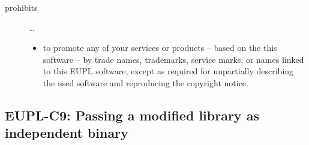 \begin{description}
\begin{itemize}
\end{itemize}

\item[prohibits] \ldots
\begin{itemize}
  \item to promote any of your services or products -- based on the this software
  -- by trade names, trademarks, service marks, or names linked to this EUPL
  software, except as required for unpartially describing the used software and
  reproducing the copyright notice.
\end{itemize}

\end{description}


\subsection{EUPL-C9: Passing a modified library as independent binary}
\label{OSUC-08B-EUPL}


